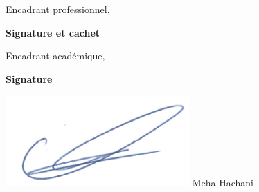 \thispagestyle{empty}

\begin{center}
    \begin{minipage}[l]{1\columnwidth}
        \begin{tcolorbox}[colback=white,boxrule=5pt,arc=10pt,height=105mm]{
            \vspace{2cm}
            \large \@proSignSentence
            \vspace{1mm}
            \begin{center}
                \Large
                Encadrant professionnel, \textbf{\@proFramerName}
            \end{center}
            \vspace{5mm}
            \hspace{0.71\columnwidth}\textbf{\large Signature et cachet}
        }
        \end{tcolorbox}
    \end{minipage}
    
    \vspace{2cm}
    
    \begin{minipage}[l]{1\columnwidth}
        \begin{tcolorbox}[colback=white,boxrule=5pt,arc=10pt,height=105mm]{
            \vspace{2cm}
            \large \@academicSignSentence
            \vspace{1mm}
            \begin{center}
                \Large
                Encadrant académique, \textbf{\@academicFramerName}
            \end{center}
            \vspace{5mm}
            \hspace{0.84\columnwidth}\textbf{\large Signature} 
            \begin{center}
       \includegraphics[scale=0.8]{img/signature.PNG}
       Meha Hachani
                   \end{center}
        }
        \end{tcolorbox}
    \end{minipage}
\end{center}